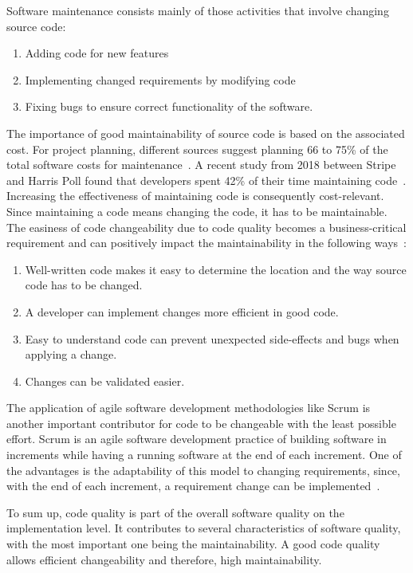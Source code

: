 Software maintenance consists mainly of those activities that involve changing source code:
\begin{enumerate}
    \item Adding code for new features
    \item Implementing changed requirements by modifying code
    \item Fixing bugs to ensure correct functionality of the software.
\end{enumerate}
The importance of good maintainability of source code is based on the associated cost. 
For project planning, different sources suggest planning 66 to 75\% of the total software costs for maintenance~\cite{yip_software_1994, galorath_accurately_2019}. A recent study from 2018 between Stripe and Harris Poll found that developers spent 42\% of their time maintaining code~\cite{stripe_developer_2018}. Increasing the effectiveness of maintaining code is consequently cost-relevant. Since maintaining a code means changing the code, it has to be maintainable. The easiness of code changeability due to code quality becomes a business-critical requirement and can positively impact the maintainability in the following ways~\cite{baggen_standardized_2012}:
\begin{enumerate}
    \item Well-written code makes it easy to determine the location and the way source code has to be changed.
    \item A developer can implement changes more efficient in good code.
    \item Easy to understand code can prevent unexpected side-effects and bugs when applying a change.
    \item Changes can be validated easier. 
\end{enumerate}

The application of agile software development methodologies like Scrum is another important contributor for code to be changeable with the least possible effort. Scrum is an agile software development practice of building software in increments while having a running software at the end of each increment. One of the advantages is the adaptability of this model to changing requirements, since, with the end of each increment, a requirement change can be implemented~\cite{schwaber_agile_2002}. 

To sum up, code quality is part of the overall software quality on the implementation level. It contributes to several characteristics of software quality, with the most important one being the maintainability. A good code quality allows efficient changeability and therefore, high maintainability.

